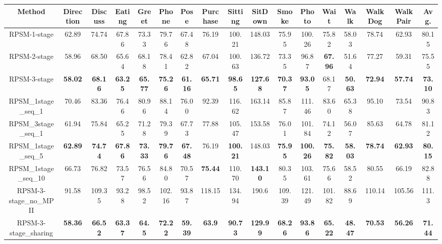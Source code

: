 \documentclass[10pt,twocolumn,letterpaper]{article}
\begin{document}
\begin{table*}[htpb]
	\centering
	\setlength{\tabcolsep}{1.5pt}
	\begin{adjustbox}{max width=1.0\textwidth}
	\begin{tabular}{@{}c|ccccccccccccccc|c@{}}
	\toprule 
	Method & Direction & Discuss & Eating & Greet & Phone & Pose & Purchase & Sitting & SitDown & Smoke & Photo & Wait & Walk & WalkDog & WalkPair & Avg. \\ \midrule
	RPSM-1-stage & 62.89 & 74.74 & 67.86 & 73.33 & 79.76 & 67.48 & 76.19 & 100.21 & 148.03 & 75.95 & 100.26 & 75.82 & 58.03 & 78.74 & 62.93 & 80.15 \\
	RPSM-2-stage & 58.96 & 68.50 & 65.64 & 68.18 & 78.41 & 62.82 & 67.04 & 100.63 & 136.72 & 73.35 & 96.87 & \textbf{67.96} & 51.64 & 77.27 & 59.31 & 75.55 \\
	RPSM-3-stage & \textbf{58.02} & \textbf{68.16} & \textbf{63.25} & \textbf{65.77} & \textbf{75.26} & \textbf{61.16} & \textbf{65.71} & \textbf{98.65} & \textbf{127.68} & \textbf{70.37} & \textbf{93.05} & 68.17 & \textbf{50.63} & \textbf{72.94} & \textbf{57.74} & \textbf{73.10} \\ 
	RPSM\_1stage\_seq\_1 & 70.46 & 83.36 & 76.46 & 80.96 & 88.14 & 76.00 & 92.39 & 116.62 & 163.14 & 85.87 & 111.46 & 83.60 & 65.38 & 95.10 & 73.54 & 90.83 \\
	RPSM\_3stage\_seq\_1 & 61.94 & 75.84 & 65.25 & 71.28 & 79.39 & 67.73 & 77.88 & 105.47 & 153.58 & 76.01 & 101.84 & 74.12 & 56.07 & 85.63 & 64.78 & 81.12 \\
	\hline
		RPSM\_1stage\_seq\_5 & \textbf{62.89} & \textbf{74.74} & \textbf{67.86} & \textbf{73.33} & \textbf{79.76} & \textbf{67.48} & 76.19 & \textbf{100.21} & 148.03 & \textbf{75.95} & \textbf{100.26} & \textbf{75.82} & \textbf{58.03} & \textbf{78.74} & \textbf{62.93} & \textbf{80.15} \\
	RPSM\_1stage\_seq\_10 & 66.73 & 76.82 & 73.57 & 76.56 & 84.80 & 70.57 & \textbf{75.44} & 110.70 & \textbf{143.10} & 80.35 & 103.61 & 75.66 & 58.52 & 80.55 & 66.19 & 82.88 \\ 
	\hline
		RPSM-3-stage\_no\_MPII & 91.58 &109.35&93.28&98.52&102.16&93.87&118.15&134.94	&190.6&109.39&121.49&101.82&88.69&110.14&105.56&111.3 \\
		RPSM-3-stage\_sharing & \textbf{58.36} & \textbf{66.52} & \textbf{63.37} & \textbf{64.5} & \textbf{72.22} & \textbf{59.39} & \textbf{63.9} & \textbf{90.73} & \textbf{129.99} &	\textbf{68.26} & \textbf{93.86} & \textbf{65.22} & \textbf{48.47} & \textbf{70.53} & \textbf{56.26} & \textbf{71.44} \\


\end{tabular}
\end{adjustbox}
\end{table*}
\end{document}
